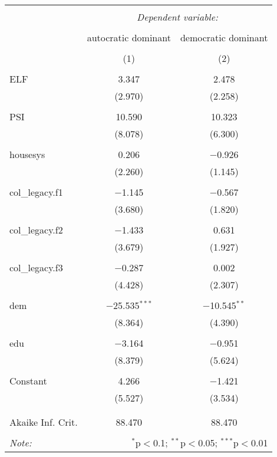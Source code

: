 
\begin{table}[!htbp] \centering 
  \caption{} 
  \label{} 
\begin{tabular}{@{\extracolsep{5pt}}lcc} 
\\[-1.8ex]\hline 
\hline \\[-1.8ex] 
 & \multicolumn{2}{c}{\textit{Dependent variable:}} \\ 
\cline{2-3} 
\\[-1.8ex] & autocratic dominant & democratic dominant \\ 
\\[-1.8ex] & (1) & (2)\\ 
\hline \\[-1.8ex] 
 ELF & 3.347 & 2.478 \\ 
  & (2.970) & (2.258) \\ 
  & & \\ 
 PSI & 10.590 & 10.323 \\ 
  & (8.078) & (6.300) \\ 
  & & \\ 
 housesys & 0.206 & $-$0.926 \\ 
  & (2.260) & (1.145) \\ 
  & & \\ 
 col\_legacy.f1 & $-$1.145 & $-$0.567 \\ 
  & (3.680) & (1.820) \\ 
  & & \\ 
 col\_legacy.f2 & $-$1.433 & 0.631 \\ 
  & (3.679) & (1.927) \\ 
  & & \\ 
 col\_legacy.f3 & $-$0.287 & 0.002 \\ 
  & (4.428) & (2.307) \\ 
  & & \\ 
 dem & $-$25.535$^{***}$ & $-$10.545$^{**}$ \\ 
  & (8.364) & (4.390) \\ 
  & & \\ 
 edu & $-$3.164 & $-$0.951 \\ 
  & (8.379) & (5.624) \\ 
  & & \\ 
 Constant & 4.266 & $-$1.421 \\ 
  & (5.527) & (3.534) \\ 
  & & \\ 
\hline \\[-1.8ex] 
Akaike Inf. Crit. & 88.470 & 88.470 \\ 
\hline 
\hline \\[-1.8ex] 
\textit{Note:}  & \multicolumn{2}{r}{$^{*}$p$<$0.1; $^{**}$p$<$0.05; $^{***}$p$<$0.01} \\ 
\end{tabular} 
\end{table} 
